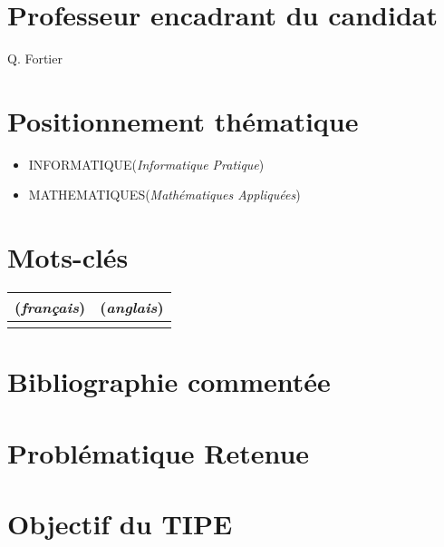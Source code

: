 \documentclass[a4paper, 11pt]{article}
\author{Arsène MALLET}
\title{}
\begin{document}
    
\begin{center}
    {\textbf {}}
\end{center}

\vspace{5mm}

\section*{Professeur encadrant du candidat}
Q. Fortier

\section*{Positionnement th\'ematique}
\begin{itemize}
    \item INFORMATIQUE(\textit{Informatique Pratique})
    \item MATHEMATIQUES(\textit{Math\'ematiques Appliqu\'ees})
\end{itemize}

\section*{Mots-cl\'es}

\begin{tabular}{l l} 
    (\textit{français}) & (\textit{anglais}) \\ \hline
     & \\
    \end{tabular}

\section*{Bibliographie comment\'ee}



\section*{Probl\'ematique Retenue}


\section*{Objectif du TIPE}


\printbibliography[title=Références bibliographiques] 
\end{document}
